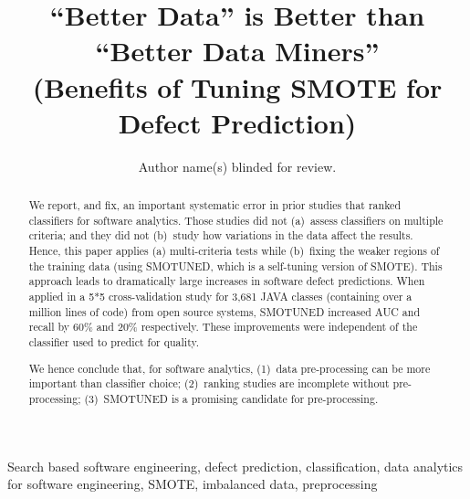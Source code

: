 \documentclass[10pt,conference]{IEEEtran}
\theoremstyle{break}
\theoremstyle{break}
\newcommand{\sma}{{\sc SMOTE}}
\newcommand{\smb}{{\sc SMOTUNED}}
\begin{document}
\pagestyle{plain}

\title{``Better Data'' is Better than ``Better Data Miners''\\ (Benefits of Tuning SMOTE for Defect Prediction) }



\author{Author name(s) blinded for review.}


\maketitle

\begin{abstract}
We report, and fix, an important systematic error in prior
studies that ranked classifiers for software analytics.
Those studies  did  not (a)~assess classifiers on multiple   criteria;
and they did not 
(b)~study  how variations in the  data affect the results. 
Hence, 
this paper applies (a)  multi-criteria tests while (b)~fixing the weaker regions of the training
 data (using {\smb}, which is a self-tuning version of {\sma}).
This approach
leads to dramatically large increases in software defect predictions.
When applied in a 5*5 cross-validation study for  3,681	JAVA classes (containing over a million lines of code) from open source  systems,
{\smb} increased
AUC and recall by 60\% and 20\% respectively. 
These improvements were independent of the classifier used to
predict for quality.

We hence conclude that, for  software analytics, (1)~data
pre-processing can be more important than  classifier
choice;
(2)~ranking studies  are  incomplete  without
 pre-processing;
(3)~{\smb} is a   promising candidate for  pre-processing.

\end{abstract}


\begin{IEEEkeywords}
Search based software engineering,
defect prediction, classification, 
data analytics for software engineering, SMOTE,  imbalanced data, preprocessing
\end{IEEEkeywords}
\end{document}
